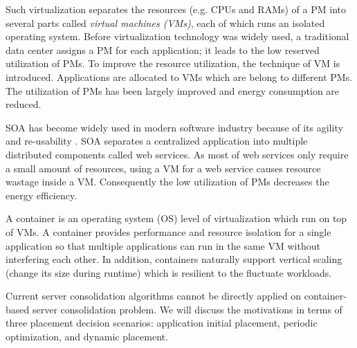  Such virtualization separates the resources (e.g. CPUs and RAMs) of a PM into several parts called \emph{virtual machines (VMs)}, each of which runs an isolated operating system. Before virtualization technology was widely used, a traditional data center assigns a PM for each application; it leads to the low reserved utilization of PMs. To improve the resource utilization, the technique of VM is introduced. Applications are allocated to VMs which are belong to different PMs. The utilization of PMs has been largely improved and energy consumption are reduced. 

 SOA has become widely used in modern software industry because of its agility and re-usability \cite{Sprott:2004wt}. SOA separates a centralized application into multiple distributed components called web services. As most of web services only require a small amount of resources,  using a VM for a web service causes resource wastage inside a VM. Consequently the low utilization of PMs decreases the energy efficiency. 


 A container is an operating system (OS) level of virtualization which run on top of VMs. A container provides performance and resource isolation for a single application so that multiple applications can run in the same VM without interfering each other. In addition, containers naturally support vertical scaling (change its size during runtime)\cite{Vaquero:2011gb} which is resilient to the fluctuate workloads.  

 Current server consolidation algorithms cannot be directly applied on container-based server consolidation problem. We will discuss the motivations in terms of three placement decision scenarios: application initial placement, periodic optimization, and dynamic placement.

